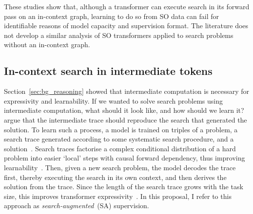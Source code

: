 These studies show that, although a transformer can execute search in its forward pass on an in-context graph, learning to do so from SO data can fail for identifiable reasons of model capacity and supervision format.
The literature does not develop a similar analysis of SO transformers applied to search problems without an in-context graph.

\subsection{In-context search in intermediate tokens}
\label{sec:bg_search_lm_incontext}

Section~\ref{sec:bg_reasoning} showed that intermediate computation is necessary for expressivity and learnability.
If we wanted to solve search problems using intermediate computation, what should it look like, and how should we learn it?
\citet{xiangSystem2Reasoning2025} argue that the intermediate trace should reproduce the search that generated the solution.
To learn such a process, a model is trained on triples of a problem, a search trace generated according to some systematic search procedure, and a solution~\citep{lehnertBetterPlanningTransformers2024,gandhiStreamSearchSoS2024}.
Search traces factorise a complex conditional distribution of a hard problem into easier `local' steps with causal forward dependency, thus improving learnability~\citep{abbeHowFarCan2024,wiesSubTaskDecompositionEnables2023}.
Then, given a new search problem, the model decodes the trace first, thereby executing the search in its own context, and then derives the solution from the trace.
Since the length of the search trace grows with the task size, this improves transformer expressivity~\citep{merrillExpressivePowerTransformers2024}.
In this proposal, I refer to this approach as \emph{search-augmented}~(SA) supervision.

